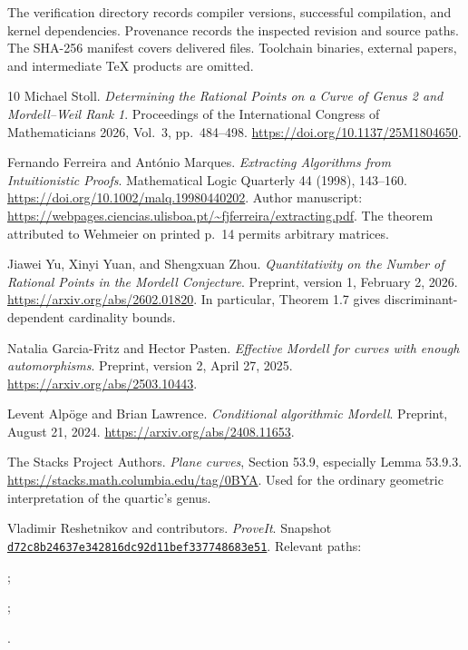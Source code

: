 \documentclass[11pt,letterpaper]{article}
\theoremstyle{definition}
\begin{document}
The verification directory records compiler versions, successful
compilation, and kernel dependencies. Provenance records the inspected
revision and source paths. The SHA-256 manifest covers delivered files.
Toolchain binaries, external papers, and intermediate TeX products
are omitted.

\begin{thebibliography}{10}
Michael Stoll. \emph{Determining the Rational Points on a Curve of Genus 2
and Mordell--Weil Rank 1}. Proceedings of the International Congress of
Mathematicians 2026, Vol.~3, pp.~484--498.
\url{https://doi.org/10.1137/25M1804650}.

Fernando Ferreira and Ant\'onio Marques.
\emph{Extracting Algorithms from Intuitionistic Proofs}.
Mathematical Logic Quarterly 44 (1998), 143--160.
\url{https://doi.org/10.1002/malq.19980440202}.
Author manuscript:
\url{https://webpages.ciencias.ulisboa.pt/~fjferreira/extracting.pdf}.
The theorem attributed to Wehmeier on printed p.~14 permits arbitrary
matrices.

Jiawei Yu, Xinyi Yuan, and Shengxuan Zhou.
\emph{Quantitativity on the Number of Rational Points in the Mordell
Conjecture}. Preprint, version 1, February 2, 2026.
\url{https://arxiv.org/abs/2602.01820}.
In particular, Theorem 1.7 gives discriminant-dependent cardinality bounds.

Natalia Garcia-Fritz and Hector Pasten.
\emph{Effective Mordell for curves with enough automorphisms}.
Preprint, version 2, April 27, 2025.
\url{https://arxiv.org/abs/2503.10443}.

Levent Alp\"oge and Brian Lawrence.
\emph{Conditional algorithmic Mordell}.
Preprint, August 21, 2024.
\url{https://arxiv.org/abs/2408.11653}.

The Stacks Project Authors.
\emph{Plane curves}, Section 53.9, especially Lemma 53.9.3.
\url{https://stacks.math.columbia.edu/tag/0BYA}.
Used for the ordinary geometric interpretation of the quartic's genus.

{\raggedright
Vladimir Reshetnikov and contributors. \emph{ProveIt}.
Snapshot
\href{https://github.com/VladimirReshetnikov/ProveIt/commit/d72c8b24637e342816dc92d11bef337748683e51}
{\texttt{d72c8b24637e342816dc92d11bef337748683e51}}.
Relevant paths:\par
{};\par
{};\par
{}.
\par}
\end{thebibliography}
\end{document}
